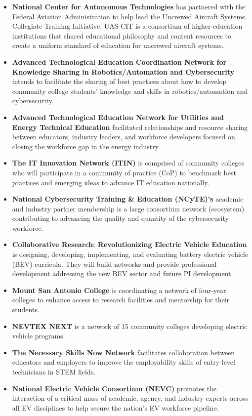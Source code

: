 \documentclass[
]{report}
\providecommand{\tightlist}{%
  \setlength{\itemsep}{0pt}\setlength{\parskip}{0pt}}
\begin{document}
\begin{itemize}
\tightlist
\item
  \textbf{National Center for Autonomous Technologies} has partnered with the Federal Aviation Administration to help lead the Uncrewed Aircraft Systems Collegiate Training Initiative. UAS-CIT is a consortium of higher-education institutions that shared educational philosophy and content resources to create a uniform standard of education for uncrewed aircraft systems.
\item
  \textbf{Advanced Technological Education Coordination Network for Knowledge Sharing in Robotics/Automation and Cybersecurity} intends to facilitate the sharing of best practices about how to develop community college students' knowledge and skills in robotics/automation and cybersecurity.
\item
  \textbf{Advanced Technological Education Network for Utilities and Energy Technical Education} facilitated relationships and resource sharing between educators, industry leaders, and workforce developers focused on closing the workforce gap in the energy industry.
\item
  \textbf{The IT Innovation Network (ITIN)} is comprised of community colleges who will participate in a community of practice (CoP) to benchmark best practices and emerging ideas to advance IT
  education nationally.
\item
  \textbf{National Cybersecurity Training \& Education (NCyTE)'s} academic and industry partner membership is a large consortium network (ecosystem) contributing to advancing the quality and quantity of the cybersecurity workforce.
\item
  \textbf{Collaborative Research: Revolutionizing Electric Vehicle Education} is designing, developing, implementing, and evaluating battery electric vehicle (BEV) curricula. They will build networks and provide professional development addressing the new BEV sector and future PI development.
\item
  \textbf{Mount San Antonio College} is coordinating a network of four-year colleges to enhance access to research facilities and mentorship for their students.
\item
  \textbf{NEVTEX NEXT} is a network of 15 community colleges developing electric vehicle programs.
\item
  \textbf{The Necessary Skills Now Network} facilitates collaboration between educators and employers to improve the employability skills of entry-level technicians in STEM fields.
\item
  \textbf{National Electric Vehicle Consortium (NEVC)} promotes the interaction of a critical mass of academic, agency, and industry experts across all EV disciplines to help secure the nation's EV workforce pipeline.
\end{itemize}
\end{document}
